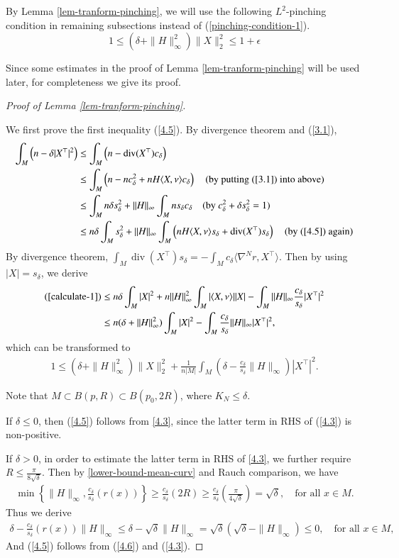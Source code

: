 \documentclass{amsart}
\numberwithin{equation}{section}
\theoremstyle{remark}
\renewcommand{\(}{\left(}
\renewcommand{\)}{\right)}
\renewcommand{\~}{\tilde}
\renewcommand{\-}{\overline}
\renewcommand{\d}{\delta}
\newcommand{\e}{\epsilon}
\newcommand{\divv}{\operatorname{div }}
\begin{document}
By Lemma \ref{lem-tranform-pinching}, we will use the following $L^2$-pinching condition in remaining subsections instead of (\ref{pinching-condition-1}).
\begin{equation}\label{l2-pinching}
1\le (\d+\|H\|_\infty^2)\|X\|_2^2 \leq 1+\e
\end{equation}

Since some estimates in the proof of Lemma \ref{lem-tranform-pinching} will be used later, for completeness we give its proof.
\begin{proof}[Proof of Lemma \ref{lem-tranform-pinching}]
	~
	
	We first prove the first inequality (\ref{4.5}). By divergence theorem and (\ref{3.1}),
	\begin{align}
	\int_M \(n-\d|X^\top|^2\)& \leq \int_M \(n-\divv(X^\top) c_\d\) \notag\\
	& \leq \int_M \(n-n c^2_\d+nH\langle X,\nu \rangle  c_\d\) \quad (\text{by putting (\ref{3.1}) into above})\notag\\
	& \leq  \int_M n\d  s_\d^2+\|H\|_\infty\int_M n  s_\d  c_\d \quad (\text{by $c^2_\d+\d s_\d^2=1$}) \notag\\
	&\leq  n\d\int_M  s_\d^2+\|H\|_\infty\int_M \(nH\langle X,\nu\rangle s_\d+\divv(X^\top) s_\d \) \quad (\text{by (\ref{4.5}) again}) \label{calculate-1}
	\end{align}
	By divergence theorem, $\int_M \divv(X^\top)s_\d=-\int_M c_\d \langle  \nabla^N r, X^\top\rangle $. Then by using $|X|=s_\d$, we derive
	\begin{align}
	(\ref{calculate-1})
	& \leq  n\d\int_M |X|^2+n\|H\|_\infty^2\int_M |\langle X,\nu\rangle||X|-\int_M \|H\|_\infty\frac{ c_\d}{ s_\d}|X^\top|^2 \notag\\
	& \leq n(\d+\|H\|_\infty^2)\int_M |X|^2-\int_M \frac{ c_\d}{ s_\d}\|H\|_\infty|X^\top|^2, \label{4.2}
	\end{align}
	which can be transformed to
	\begin{align}\label{4.3}
	1\leq (\d+\|H\|_\infty^2)\|X\|_2^2+\frac{1}{n|M|}\int_M \(\d-\frac{ c_\d}{ s_\d} \|H\|_\infty\) |X^\top|^2.
	\end{align}
	
	Note that $M\subset B(p,R)\subset B(p_0,2R)$, where $K_N\le \delta$.
	
	If $\d \leq 0$, then (\ref{4.5}) follows from \eqref{4.3}, since the latter term in RHS of (\ref{4.3}) is non-positive.
	
	If $\d>0$, in order to estimate the latter term in RHS of \eqref{4.3}, we further require $R\le \frac{\pi}{8\sqrt{\d}}$. Then by \eqref{lower-bound-mean-curv} and Rauch comparison, we have
	\begin{align*}
	\min\left\{\|H\|_\infty,\frac{c_\d}{s_\d}(r(x))\right\}\geq \frac{ c_\d}{ s_\d}(2R)\geq \frac{c_\d}{s_\d}\(\frac{\pi}{4\sqrt{\d}}\)=\sqrt{\d}, \quad \text{for all $x\in M$}.
	\end{align*}
	Thus we derive
	\begin{align}\label{4.6}
	\d-\frac{c_\d}{ s_\d}(r(x)) \|H\|_\infty\leq \d-\sqrt{\d}\|H\|_\infty=\sqrt{\d}(\sqrt{\d}-\|H\|_\infty)\leq 0, \quad \text{for all $x\in M$},
	\end{align}
	And (\ref{4.5}) follows from (\ref{4.6}) and (\ref{4.3}).
	

\end{proof}
\end{document}

